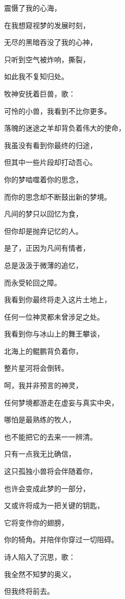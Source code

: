 \documentclass[UTF8]{article}
\begin{document}
\par 震慑了我的心海，
\par 在我想窥视梦的发展时刻，
\par 无尽的黑暗吞没了我的心神，
\par 只听到空气被炸响，撕裂，
\par 如此我不复知归处。
\\[0.6cm]
\par 牧神安抚着巨兽，歌：
\\[0.6cm]
\par 可怜的小兽，我看到不比你更多。
\par 落魄的迷途之羊却背负着伟大的使命，
\par 我虽没有看到你最终的归途，
\par 但其中一些片段却打动吾心。
\par 你的梦啮噬着你的思念，
\par 而你的思念却不断鼓出新的梦境。
\par 凡间的梦只以回忆为食，
\par 但你却是抛弃记忆的人。
\par 是了，正因为凡间有情者，
\par 总是汲汲于微薄的追忆，
\par 而永受轮回之障。
\par 我看到你最终将走入这片土地上，
\par 任何一位神灵都未曾涉足之处。
\par 我看到你与冰山上的舞王攀谈，
\par 北海上的鲲鹏背负着你，
\par 整片星河将会倒转。
\par 呵，我并非预言的神灵，
\par 任何梦境都游走在虚妄与真实中央，
\par 哪怕是最熟练的牧人，
\par 也不能把它的去来一一辨清。
\par 只有一点我无比确信，
\par 这只孤独小兽将会伴随着你，
\par 也许会变成此梦的一部分，
\par 又或许将成为一把关键的钥匙，
\par 它将变作你的翅膀，
\par 你的犄角。并陪伴你穿过一切阻碍。
\\[0.6cm]
\par 诗人陷入了沉思，歌：
\\[0.6cm]
\par 我全然不知梦的奥义，
\par 但我终将前去。
\end{document}
